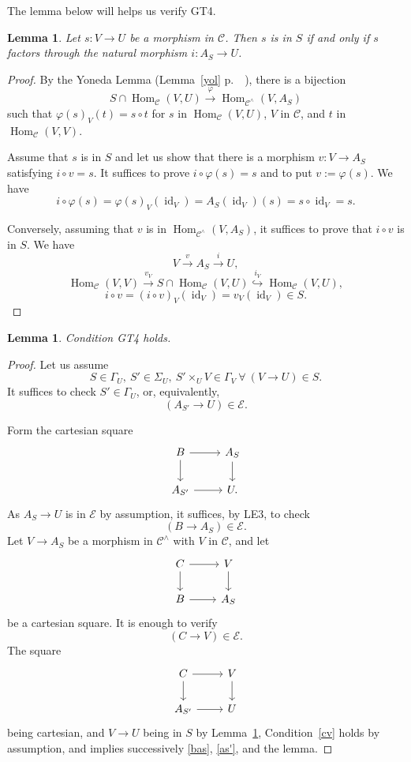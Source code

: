\documentclass[12pt]{article}%
\newtheorem{lem}[thm]{Lemma}
\theoremstyle{remark}
\theoremstyle{definition}
\newcommand{\cc}{\mathcal}
\newcommand{\C}{\mathcal C}
\newcommand{\pp}{\varphi}
\newcommand{\xr}{\xrightarrow}
\DeclareMathOperator{\id}{id}
\DeclareMathOperator{\Hom}{Hom}%
\begin{document}
The lemma below will helps us verify GT4. 

\begin{lem}\label{prepagt4}
Let $s:V\to U$ be a morphism in $\C$. Then $s$ is in $S$ if and only if $s$ factors through the natural morphism $i:A_S\to U$.
\end{lem}

\begin{proof}
By the Yoneda Lemma (Lemma~\ref{yol} p.~~\pageref{yol}), there is a bijection 
$$
S\cap\Hom_\C(V,U)\xr\pp\Hom_{\C^\wedge}(V,A_S)
$$
such that $\pp(s)_V(t)=s\circ t$ for $s$ in $\Hom_\C(V,U)$, $V$ in $\C$, and $t$ in $\Hom_\C(V,V)$. 

Assume that $s$ is in $S$ and let us show that there is a morphism $v:V\to A_S$ satisfying $i\circ v=s$. It suffices to prove $i\circ\pp(s)=s$ and to put $v:=\pp(s)$. We have 
$$
i\circ\pp(s)=\pp(s)_V(\id_V)=A_S(\id_V)(s)=s\circ\id_V=s.
$$ 

Conversely, assuming that $v$ is in $\Hom_{\C^\wedge}(V,A_S)$, it suffices to prove that $i\circ v$ is in $S$. We have 
$$
V\xr vA_S\xr iU,
$$
$$
\Hom_\C(V,V)\xr{v_V}S\cap\Hom_\C(V,U)\overset{i_V}{\hookrightarrow}\Hom_\C(V,U),
$$
$$
i\circ v=(i\circ v)_V(\id_V)=v_V(\id_V)\in S.
$$
\end{proof} 

\begin{lem}
Condition GT4 holds.
\end{lem}

\begin{proof}
Let us assume 
$$
S\in\Gamma_U,\ S'\in\Sigma_U,\ S'\times_UV\in\Gamma_V\ \forall\ (V\to U)\in S.
$$ 
It suffices to check $S'\in\Gamma_U$, or, equivalently, 
%
\begin{equation}\label{as'}
(A_{S'}\to U)\in\cc E.
\end{equation}

Form the cartesian square 
$$
\begin{tikzcd}
B\ar{r}\ar{d}&A_S\ar{d}\\ 
A_{S'}\ar{r}&U.
\end{tikzcd}
$$ 
As $A_S\to U$ is in $\cc E$ by assumption, it suffices, by LE3, to check  
%
\begin{equation}\label{bas}
(B\to A_S)\in\cc E.
\end{equation}
%
Let $V\to A_S$ be a morphism in $\C^\wedge$ with $V$ in $\C$, and let 
$$
\begin{tikzcd}
C\ar{r}\ar{d}&V\ar{d}\\ 
B\ar{r}&A_S
\end{tikzcd}
$$ 
be a cartesian square. It is enough to verify 
%
\begin{equation}\label{cv}
(C\to V)\in\cc E.
\end{equation} 
% 
The square 
$$
\begin{tikzcd}
C\ar{r}\ar{d}&V\ar{d}\\ 
A_{S'}\ar{r}&U
\end{tikzcd}
$$ 
being cartesian, and $V\to U$ being in $S$ by Lemma~\ref{prepagt4}, Condition~\eqref{cv} holds by assumption, and implies successively \eqref{bas}, \eqref{as'}, and the lemma. 
\end{proof}
\end{document}
